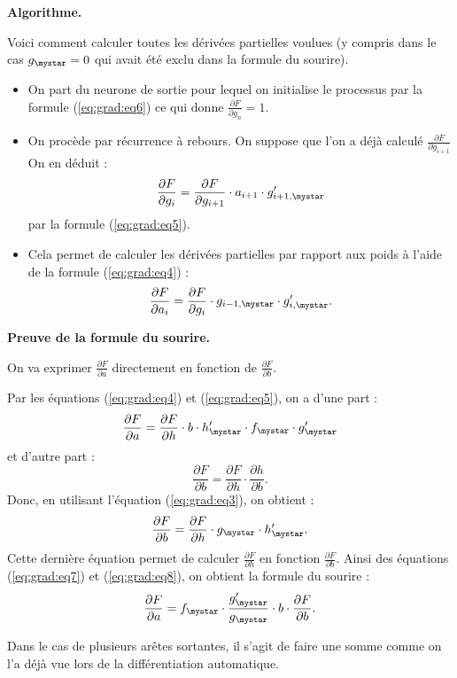 \documentclass[11pt,class=report,crop=false]{standalone}
\begin{document}
\bigskip
\textbf{Algorithme.}


Voici comment calculer toutes les dérivées partielles voulues (y compris dans le cas $g_\mystar=0$ qui avait été exclu dans la formule du sourire).
\begin{itemize}
  \item On part du neurone de sortie pour lequel on initialise le processus par la formule
  (\ref{eq:grad:eq6}) ce qui donne 
  $\frac{\partial F}{\partial g_n} = 1$.
  \item On procède par récurrence à rebours. On suppose que l'on a déjà calculé
  $\frac{\partial F}{\partial g_{i+1}}$
  On en déduit :
  $$\frac{\partial F}{\partial g_{i}} =  \frac{\partial F}{\partial g_{i+1}} \cdot a_{i+1} \cdot  g'_{i+1,\mystar}$$
  par la formule (\ref{eq:grad:eq5}).
  \item Cela permet de calculer les dérivées partielles par rapport aux poids à l'aide de la formule (\ref{eq:grad:eq4}) :
  $$\frac{\partial F}{\partial a_i} = \frac{\partial F}{\partial g_i} \cdot g_{i-1,\mystar} \cdot  g'_{i,\mystar}.$$
\end{itemize}



\bigskip
\textbf{Preuve de la formule du sourire.}

On va exprimer $\frac{\partial F}{\partial a}$ directement en fonction de $\frac{\partial F}{\partial b}$.

Par les équations (\ref{eq:grad:eq4}) et (\ref{eq:grad:eq5}), on a d'une part :
\begin{equation}
\frac{\partial F}{\partial a} =   \frac{\partial F}{\partial h} \cdot b \cdot  h'_\mystar \cdot f_\mystar \cdot g'_\mystar
\label{eq:grad:eq7}
\end{equation}
et d'autre part :
$$\frac{\partial F}{\partial b} =  \frac{\partial F}{\partial h} \cdot \frac{\partial h}{\partial b}.$$
Donc, en utilisant l'équation (\ref{eq:grad:eq3}), on obtient :
\begin{equation}
\frac{\partial F}{\partial b} =   \frac{\partial F}{\partial h} \cdot g_\mystar \cdot  h'_\mystar.
\label{eq:grad:eq8}
\end{equation}
Cette dernière équation permet de calculer $\frac{\partial F}{\partial h}$ en fonction $\frac{\partial F}{\partial b}$. Ainsi des équations (\ref{eq:grad:eq7}) et (\ref{eq:grad:eq8}), on obtient la formule du sourire :
$$\frac{\partial F}{\partial a} = f_\mystar \cdot \frac{g'_\mystar}{g_\mystar} \cdot b \cdot \frac{\partial F}{\partial b}.$$

Dans le cas de plusieurs arêtes sortantes, il s'agit de faire une somme comme on l'a déjà vue lors de la différentiation automatique.
\end{document}
